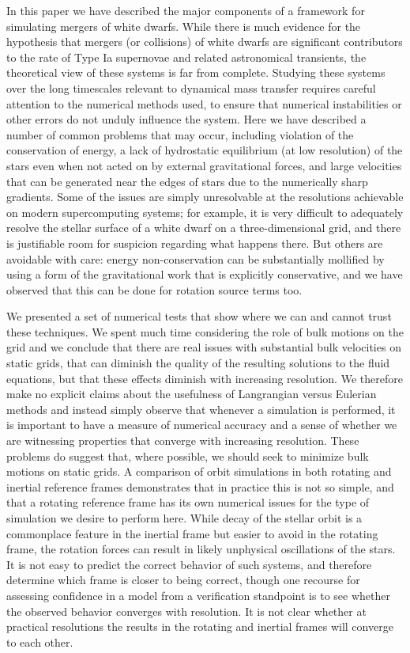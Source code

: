 \documentclass[iop,numberedappendix]{../emulateapj}
\begin{document}
In this paper we have described the major components of a framework for 
simulating mergers of white dwarfs. While there is much evidence for the 
hypothesis that mergers (or collisions) of white dwarfs are significant 
contributors to the rate of Type Ia supernovae and related astronomical 
transients, the theoretical view of these systems is far from complete. 
Studying these systems over the long timescales relevant to dynamical 
mass transfer requires careful attention to the numerical methods used, 
to ensure that numerical instabilities or other errors do not unduly 
influence the system. Here we have described a number of common problems
that may occur, including violation of the conservation of energy, 
a lack of hydrostatic equilibrium (at low resolution) of the stars 
even when not acted on by external gravitational forces, and large 
velocities that can be generated near the edges of stars due to the 
numerically sharp gradients. Some of the issues are simply unresolvable
at the resolutions achievable on modern supercomputing systems; 
for example, it is very difficult to adequately resolve the stellar 
surface of a white dwarf on a three-dimensional grid, and there is 
justifiable room for suspicion regarding what happens there. But others
are avoidable with care: energy non-conservation can be substantially 
mollified by using a form of the gravitational work that is explicitly 
conservative, and we have observed that this can be done for rotation 
source terms too.

We presented a set of numerical tests that show where we can 
and cannot trust these techniques. We spent much time considering 
the role of bulk motions on the grid and we conclude that there 
are real issues with substantial bulk velocities on static grids, 
that can diminish the quality of the resulting solutions to the 
fluid equations, but that these effects diminish with increasing 
resolution. We therefore make no explicit claims about the usefulness 
of Langrangian versus Eulerian methods and instead simply observe 
that whenever a simulation is performed, it is important to have 
a measure of numerical accuracy and a sense of whether we are 
witnessing properties that converge with increasing resolution.
These problems do suggest that, where possible, we should seek to 
minimize bulk motions on static grids. A comparison of orbit 
simulations in both rotating and inertial reference frames 
demonstrates that in practice this is not so simple, and that 
a rotating reference frame has its own numerical issues for 
the type of simulation we desire to perform here. While decay 
of the stellar orbit is a commonplace feature in the inertial frame 
but easier to avoid in the rotating frame, the rotation forces 
can result in likely unphysical oscillations of the stars. It 
is not easy to predict the correct behavior of such systems,
and therefore determine which frame is closer to being correct, 
though one recourse for assessing confidence in a model from a 
verification standpoint is to see whether the observed 
behavior converges with resolution. It is not clear 
whether at practical resolutions the results in the 
rotating and inertial frames will converge to each other.
\end{document}

